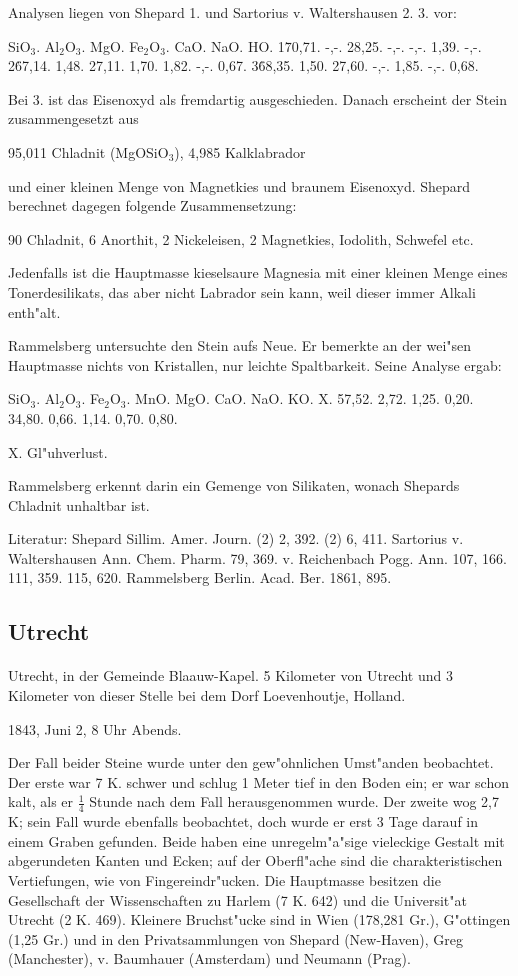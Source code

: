 \documentclass[a4paper, 11pt, oneside]{article}
\begin{document}
Analysen liegen von Shepard 1. und Sartorius v. Waltershausen 2. 3. vor:

SiO$_{3}$. Al$_{2}$O$_{3}$. MgO. Fe$_{2}$O$_{3}$. CaO. NaO. HO.  
1\. 70,71. -,-. 28,25. -,-. -,-. 1,39. -,-.  
2\. 67,14. 1,48. 27,11. 1,70. 1,82. -,-. 0,67.  
3\. 68,35. 1,50. 27,60. -,-. 1,85. -,-. 0,68.

Bei 3. ist das Eisenoxyd als fremdartig ausgeschieden. Danach erscheint der Stein zusammengesetzt aus

95,011 Chladnit (MgOSiO$_{3}$),
4,985 Kalklabrador

und einer kleinen Menge von Magnetkies und braunem Eisenoxyd. Shepard berechnet dagegen folgende Zusammensetzung:

90 Chladnit,  
6 Anorthit,  
2 Nickeleisen,  
2 Magnetkies, Iodolith, Schwefel etc.

Jedenfalls ist die Hauptmasse kieselsaure Magnesia mit einer kleinen Menge eines Tonerdesilikats, das aber nicht Labrador sein kann, weil dieser immer Alkali enth"alt.

Rammelsberg untersuchte den Stein aufs Neue. Er bemerkte an der wei"sen Hauptmasse nichts von Kristallen, nur leichte Spaltbarkeit. Seine Analyse ergab:

SiO$_{3}$. Al$_{2}$O$_{3}$. Fe$_{2}$O$_{3}$. MnO. MgO. CaO. NaO. KO. X.  
57,52. 2,72. 1,25. 0,20. 34,80. 0,66. 1,14. 0,70. 0,80.

X. Gl"uhverlust.

Rammelsberg erkennt darin ein Gemenge von Silikaten, wonach Shepards Chladnit unhaltbar ist.

\footnotesize
Literatur: Shepard Sillim. Amer. Journ. (2) 2, 392. (2) 6, 411. Sartorius v. Waltershausen Ann. Chem. Pharm. 79, 369. v. Reichenbach Pogg. Ann. 107, 166. 111, 359. 115, 620. Rammelsberg Berlin. Acad. Ber. 1861, 895.

\subsection{Utrecht}
\normalsize
\paragraph{}
Utrecht, in der Gemeinde Blaauw-Kapel. 5 Kilometer von Utrecht und 3 Kilometer von dieser Stelle bei dem Dorf Loevenhoutje, Holland.

1843, Juni 2, 8 Uhr Abends.

Der Fall beider Steine wurde unter den gew"ohnlichen Umst"anden beobachtet. Der erste war 7 K. schwer und schlug 1 Meter tief in den Boden ein; er war schon kalt, als er $\frac{1}{4}$ Stunde nach dem Fall herausgenommen wurde. Der zweite wog 2,7 K; sein Fall wurde ebenfalls beobachtet, doch wurde er erst 3 Tage darauf in einem Graben gefunden. Beide haben eine unregelm"a"sige vieleckige Gestalt mit abgerundeten Kanten und Ecken; auf der Oberfl"ache sind die charakteristischen Vertiefungen, wie von Fingereindr"ucken. Die Hauptmasse besitzen die Gesellschaft der Wissenschaften zu Harlem (7 K. 642) und die Universit"at Utrecht (2 K. 469). Kleinere Bruchst"ucke sind in Wien (178,281 Gr.), G"ottingen (1,25 Gr.) und in den Privatsammlungen von Shepard (New-Haven), Greg (Manchester), v. Baumhauer (Amsterdam) und Neumann (Prag).
\end{document}
